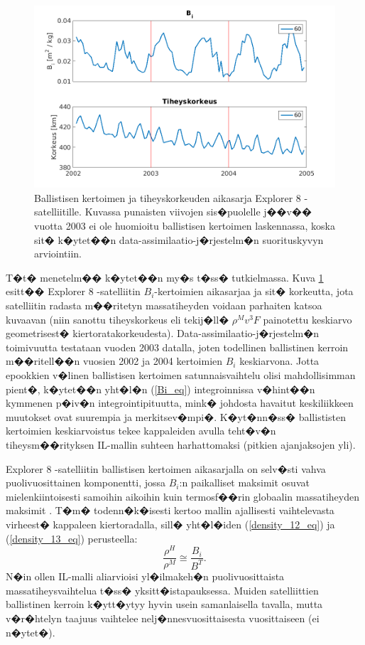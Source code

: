 \documentclass[12pt,a4paper,finnish,margin=2in]{article}
\begin{document}
\begin{figure}[t]
\includegraphics[scale = 0.5]{gradu_Bi}
\caption{Ballistisen kertoimen ja tiheyskorkeuden aikasarja Explorer 8 -satelliitille. Kuvassa punaisten viivojen sis�puolelle j��v�� vuotta 2003 ei ole huomioitu ballistisen kertoimen laskennassa, koska sit� k�ytet��n data-assimilaatio-j�rjestelm�n suorituskyvyn arviointiin.}
\label{fig:Btrue}
\end{figure}

T�t� menetelm�� k�ytet��n my�s t�ss� tutkielmassa. Kuva \ref{fig:Btrue} esitt�� Explorer 8 -satelliitin $B_i$-kertoimien aikasarjaa ja sit� korkeutta, jota satelliitin radasta m��ritetyn massatiheyden voidaan parhaiten katsoa kuvaavan (niin sanottu tiheyskorkeus eli tekij�ll� $\rho^M v^3 F$ painotettu keskiarvo geometrisest� kiertoratakorkeudesta). Data-assimilaatio-j�rjestelm�n toimivuutta testataan vuoden 2003 datalla, joten todellinen ballistinen kerroin m��ritell��n vuosien 2002 ja 2004 kertoimien $B_i$ keskiarvona. Jotta epookkien v�linen ballistisen kertoimen satunnaisvaihtelu olisi mahdollisimman pient�, k�ytet��n yht�l�n (\ref{Bi_eq}) integroinnissa v�hint��n kymmenen p�iv�n integrointipituutta, mink� johdosta havaitut keskiliikkeen muutokset ovat suurempia ja merkitsev�mpi�. K�yt�nn�ss� ballististen kertoimien keskiarvoistus tekee kappaleiden avulla teht�v�n tiheysm��rityksen IL-mallin suhteen harhattomaksi (pitkien ajanjaksojen yli).

Explorer 8 -satelliitin ballistisen kertoimen aikasarjalla on selv�sti vahva puolivuosittainen komponentti, jossa $B_i$:n paikalliset maksimit osuvat mielenkiintoisesti samoihin aikoihin kuin termosf��rin globaalin massatiheyden maksimit \citep{emmert_2015}. T�m� todenn�k�isesti kertoo mallin ajallisesti vaihtelevasta virheest� kappaleen kiertoradalla, sill� yht�l�iden (\ref{density_12_eq}) ja (\ref{density_13_eq}) perusteella:
\begin{equation} \label{obsToModel_eq}
\frac{\rho^H}{\rho^M} \cong \frac{B_i}{B^T}.
\end{equation}
N�in ollen IL-malli aliarvioisi yl�ilmakeh�n puolivuosittaista massatiheysvaihtelua t�ss� yksitt�istapauksessa. Muiden satelliittien ballistinen kerroin k�ytt�ytyy hyvin usein samanlaisella tavalla, mutta v�r�htelyn taajuus vaihtelee nelj�nnesvuosittaisesta vuosittaiseen (ei n�ytet�). 
\end{document}
